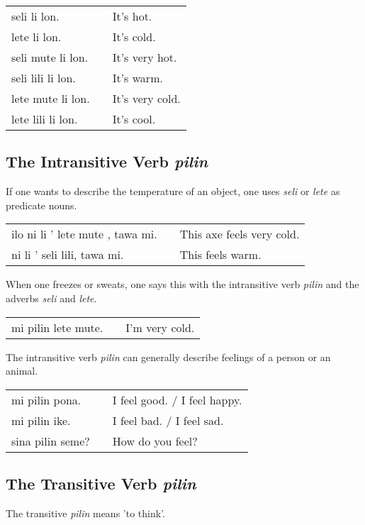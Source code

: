 \begin{supertabular}{p{5,5cm}|ll}
    seli li lon.      &  & It's hot.       \\
    lete li lon.      &  & It's cold.      \\
    seli mute li lon. &  & It's very hot.  \\
    seli lili li lon. &  & It's warm.      \\
    lete mute li lon. &  & It's very cold. \\
    lete lili li lon. &  & It's cool.      \\
\end{supertabular}

\subsection*{The Intransitive Verb \textit{pilin}}
If one wants to describe the temperature of an object, one uses \textit{seli} or \textit{lete} as predicate nouns.

\begin{supertabular}{p{5,5cm}|ll}
    ilo ni li ' lete mute , tawa mi. &  & This axe feels very cold. \\
    ni li ' seli lili, tawa mi.      &  & This feels warm.          \\
\end{supertabular}

When one freezes or sweats, one says this with the intransitive verb \textit{pilin} and the adverbs \textit{seli} and \textit{lete}.

\begin{supertabular}{p{5,5cm}|ll}
    mi pilin lete mute. &  & I'm very cold. \\
\end{supertabular}

The intransitive verb \textit{pilin} can generally describe feelings of a person or an animal.

\begin{supertabular}{p{5,5cm}|ll}
    mi pilin pona.   &  & I feel good. / I feel happy. \\
    mi pilin ike.    &  & I feel bad. / I feel sad.    \\
    sina pilin seme? &  & How do you feel?             \\
\end{supertabular}

\subsection*{The Transitive Verb \textit{pilin}}
The transitive \textit{pilin} means 'to think'.

